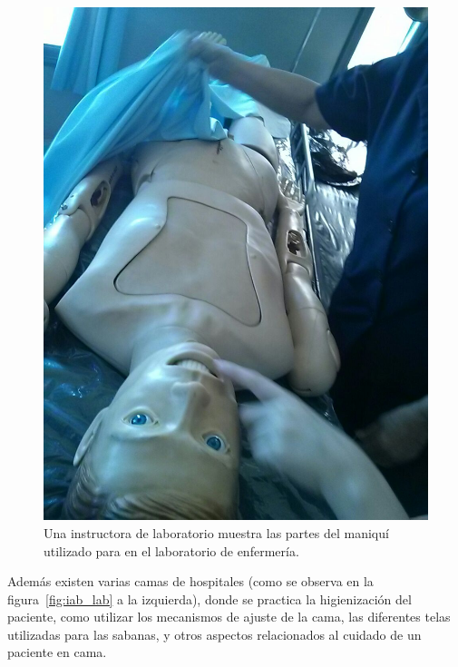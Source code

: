 \begin{figure}[h!t] 
\centering 
\includegraphics[scale=0.2,natwidth=400,natheight=200]{problema/iab_sala_3.jpg}
\caption{Una instructora de laboratorio muestra las partes del maniquí utilizado
    para en el laboratorio de enfermería.}
\label{fig:iab_mani}
\end{figure}

Además existen varias camas de hospitales (como se observa en la
figura~\ref{fig:iab_lab} a la izquierda), donde se practica la higienización del
paciente, como utilizar los mecanismos de ajuste de la cama, las diferentes
telas utilizadas para las sabanas, y otros aspectos relacionados al cuidado de
un paciente en cama.
